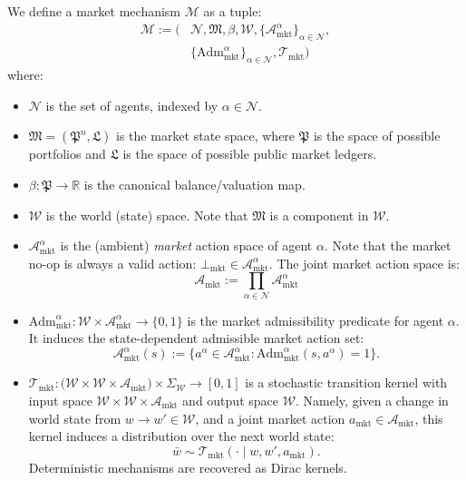 We define a market mechanism $\mathscr{M}$ as a tuple:
\begin{align*}
\mathscr{M} :=\Big(&\mathcal{N}, \mathfrak{M},\beta, \mathcal{W},\{\mathcal{A}^\alpha_{\mathrm{mkt}}\}_{\alpha\in\mathcal{N}},
\\&\{\mathrm{Adm}^\alpha_{\mathrm{mkt}}\}_{\alpha\in\mathcal{N}},\mathcal{T}_{\mathrm{mkt}}\Big)
\end{align*}
where:
\begin{itemize}
    \item $\mathcal{N}$ is the set of agents, indexed by $\alpha\in \mathcal{N}$.
    \item $\mathfrak{M}=(\mathfrak{P}^n,\mathfrak{L})$ is the market state space, where $\mathfrak{P}$ is the space of possible portfolios and $\mathfrak{L}$ is the space of possible public market ledgers.
    \item $\beta : \mathfrak{P} \to \mathbb{R}$ is the canonical balance/valuation map.
    \item $\mathcal{W}$ is the world (state) space. Note that $\mathfrak{M}$ is a component in $\mathcal{W}$.
  
    \item $\mathcal{A}^\alpha_{\mathrm{mkt}}$ is the (ambient) \textit{market} action space of agent $\alpha$. Note that the market no-op is always a valid action: $\bot_{\mathrm{mkt}} \in \mathcal{A}_{\mathrm{mkt}}^\alpha$. The joint market action space is:
    \[
\mathcal{A}_{\mathrm{mkt}} := \prod_{\alpha\in\mathcal{N}} \mathcal{A}^\alpha_{\mathrm{mkt}}
\]
    \item $\mathrm{Adm}^\alpha_{\mathrm{mkt}}:\mathcal{W}\times\mathcal{A}^\alpha_{\mathrm{mkt}}\to\{0,1\}$ is the market admissibility predicate for agent $\alpha$. It induces the state-dependent admissible market action set:
    \[
    \mathcal{A}^\alpha_{\mathrm{mkt}}(s) := \{a^\alpha\in\mathcal{A}_{\mathrm{mkt}}^\alpha : \mathrm{Adm}_{\mathrm{mkt}}^\alpha(s,a^\alpha)=1\}.
    \]
    \item $\mathcal{T}_{\mathrm{mkt}} : \Big(\mathcal{W} \times \mathcal{W} \times \mathcal{A}_{\mathrm{mkt}}\Big) \times \Sigma_{\mathcal{W}} \to [0,1]$ is a stochastic transition kernel with input space $\mathcal{W} \times \mathcal{W} \times \mathcal{A}_{\mathrm{mkt}}$ and output space $\mathcal{W}$. Namely, given a change in world state from $w \to w' \in \mathcal{W}$, and a joint market action $a_{\mathrm{mkt}}\in\mathcal{A}_{\mathrm{mkt}}$, this kernel induces a distribution over the next world state:
\[
\bar{w}\sim \mathcal{T}_{\mathrm{mkt}}(\cdot\mid w,w',a_{\mathrm{mkt}}).
\]
Deterministic mechanisms are recovered as Dirac kernels.

\end{itemize}




